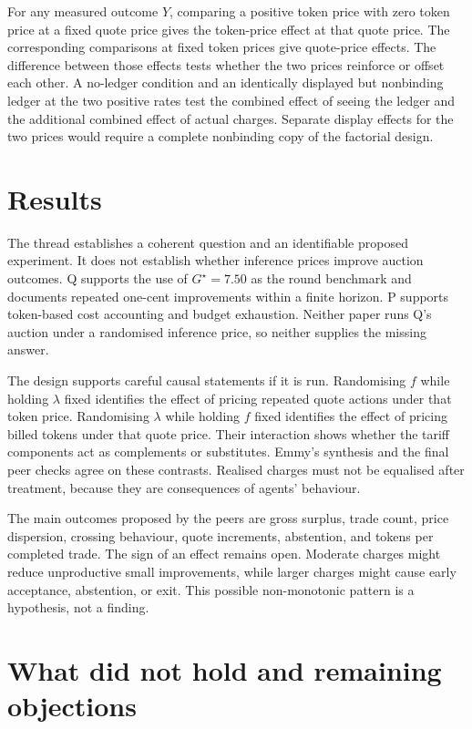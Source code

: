 \documentclass{article}
\begin{document}
For any measured outcome \(Y\), comparing a positive token price with zero token price at a fixed quote price gives the token-price effect at that quote price.  The corresponding comparisons at fixed token prices give quote-price effects.  The difference between those effects tests whether the two prices reinforce or offset each other.  A no-ledger condition and an identically displayed but nonbinding ledger at the two positive rates test the combined effect of seeing the ledger and the additional combined effect of actual charges.  Separate display effects for the two prices would require a complete nonbinding copy of the factorial design.

\section{Results}

The thread establishes a coherent question and an identifiable proposed experiment.  It does not establish whether inference prices improve auction outcomes.  Q supports the use of \(G^{\star}=7.50\) as the round benchmark and documents repeated one-cent improvements within a finite horizon.  P supports token-based cost accounting and budget exhaustion.  Neither paper runs Q's auction under a randomised inference price, so neither supplies the missing answer.

The design supports careful causal statements if it is run.  Randomising \(f\) while holding \(\lambda\) fixed identifies the effect of pricing repeated quote actions under that token price.  Randomising \(\lambda\) while holding \(f\) fixed identifies the effect of pricing billed tokens under that quote price.  Their interaction shows whether the tariff components act as complements or substitutes.  Emmy's synthesis and the final peer checks agree on these contrasts.  Realised charges must not be equalised after treatment, because they are consequences of agents' behaviour.

The main outcomes proposed by the peers are gross surplus, trade count, price dispersion, crossing behaviour, quote increments, abstention, and tokens per completed trade.  The sign of an effect remains open.  Moderate charges might reduce unproductive small improvements, while larger charges might cause early acceptance, abstention, or exit.  This possible non-monotonic pattern is a hypothesis, not a finding.

\section{What did not hold and remaining objections}
\end{document}

